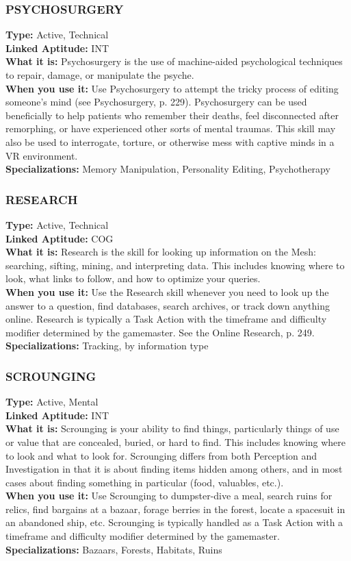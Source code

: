 \subsubsection{PSYCHOSURGERY}
\textbf{Type:} Active, Technical
\\ \textbf{Linked Aptitude:} INT
\\ \textbf{What it is:} Psychosurgery is the use of machine-aided psychological techniques to repair, damage, or
manipulate the psyche.
\\ \textbf{When you use it:} Use Psychosurgery to attempt the
tricky process of editing someone’s mind (see Psychosurgery, p. 229). Psychosurgery can be used beneficially to help patients who remember their deaths, feel
disconnected after remorphing, or have experienced
other sorts of mental traumas. This skill may also be
used to interrogate, torture, or otherwise mess with
captive minds in a VR environment.
\\ \textbf{Specializations:} Memory Manipulation, Personality
Editing, Psychotherapy

\subsubsection{RESEARCH}
\textbf{Type:} Active, Technical
\\ \textbf{Linked Aptitude:} COG
\\ \textbf{What it is:} Research is the skill for looking up information on the Mesh: searching, sifting, mining, and
interpreting data. This includes knowing where to look,
what links to follow, and how to optimize your queries.
\\ \textbf{When you use it:} Use the Research skill whenever
you need to look up the answer to a question, find
databases, search archives, or track down anything
online. Research is typically a Task Action with the
timeframe and difficulty modifier determined by the
gamemaster. See the Online Research, p. 249.
\\ \textbf{Specializations:} Tracking, by information type

\subsubsection{SCROUNGING}
\textbf{Type:} Active, Mental
\\ \textbf{Linked Aptitude:} INT
\\ \textbf{What it is:} Scrounging is your ability to find things,
particularly things of use or value that are concealed,
buried, or hard to find. This includes knowing where
to look and what to look for. Scrounging differs from
both Perception and Investigation in that it is about
finding items hidden among others, and in most cases
about finding something in particular (food, valuables, etc.).
\\ \textbf{When you use it:} Use Scrounging to dumpster-dive a
meal, search ruins for relics, find bargains at a bazaar,
forage berries in the forest, locate a spacesuit in an
abandoned ship, etc. Scrounging is typically handled
as a Task Action with a timeframe and difficulty
modifier determined by the gamemaster.
\\ \textbf{Specializations:} Bazaars, Forests, Habitats, Ruins

